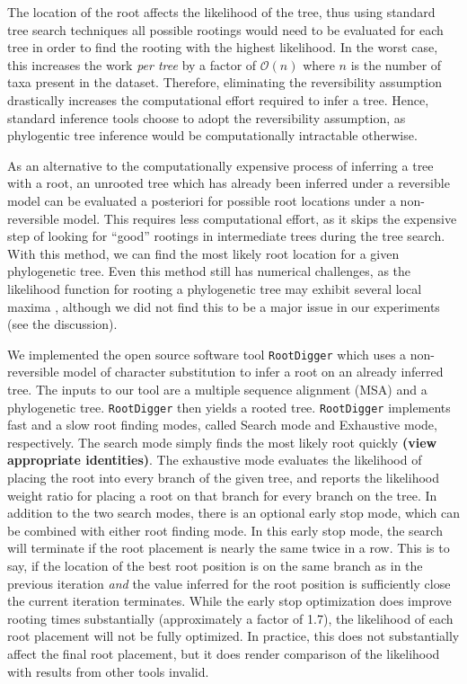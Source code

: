 \documentclass{article}
\newcommand{\RootDiggertt}{\texttt{RootDigger}}
\newcommand{\AlexisComment}[1]{{\bf \color{green} ({#1})}}
\begin{document}
The location of the root affects the likelihood of the tree, thus using standard
tree search techniques all possible rootings would need to be evaluated for each
tree in order to find the rooting with the highest likelihood.  In the worst
case, this increases the work {\em per tree} by a factor of $\mathcal{O}(n)$
where $n$ is the number of taxa present in the dataset. Therefore, eliminating
the reversibility assumption drastically increases the computational effort
required to infer a tree. Hence, standard inference tools choose to adopt
the reversibility assumption, as phylogentic tree inference would be
computationally intractable otherwise.

As an alternative to the computationally expensive process of inferring a tree
with a root, an unrooted tree which has already been inferred under a reversible
model can be evaluated a posteriori for possible root locations under a
non-reversible model. This requires less computational effort, as it skips the
expensive step of looking for ``good'' rootings in intermediate trees during the
tree search.  With this method, we can find the most likely root location for a
given phylogenetic tree.  Even this method still has numerical challenges, as
the likelihood function for rooting a phylogenetic tree may exhibit several
local maxima \cite{huelsenbeck_inferring_2002}, although we did not find this to
be a major issue in our experiments (see the discussion).

We implemented the open source software tool \RootDiggertt{} which uses a
non-reversible model of character substitution to infer a root on an already
inferred tree. The inputs to our tool are a multiple sequence alignment (MSA)
and a phylogenetic tree. \RootDiggertt{} then yields a rooted tree.
\RootDiggertt{} implements fast and a slow root finding modes, called Search
mode and Exhaustive mode, respectively. The search mode simply finds the most
likely root quickly \AlexisComment{view appropriate identities}. The exhaustive
mode evaluates the likelihood of placing the root into every branch of the given
tree, and reports the likelihood weight ratio \cite{strimmer_inferring_2002} for
placing a root on that branch for every branch on the tree. In addition to the
two search modes, there is an optional early stop mode, which can be combined
with either root finding mode. In this early stop mode, the search will
terminate if the root placement is nearly the same twice in a row. This is to
say, if the location of the best root position is on the same branch as in the
previous iteration {\em and} the value inferred for the root position is
sufficiently close the current iteration terminates.  While the early stop
optimization does improve rooting times substantially (approximately a factor of
1.7), the likelihood of each root placement will not be fully optimized.  In
practice, this does not substantially affect the final root placement, but it
does render comparison of the likelihood with results from other tools invalid.
\end{document}
